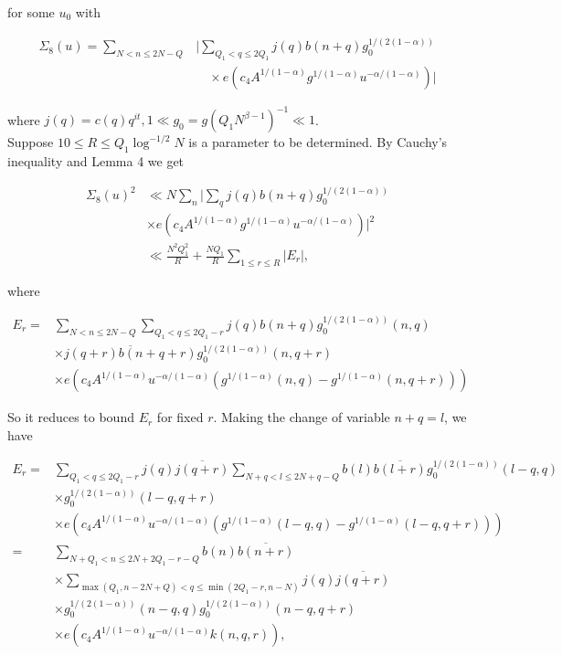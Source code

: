 \documentclass[10pt]{article}
\begin{document}
for some $u_{0}$ with


\begin{align*}
\Sigma_{8}(u)=\sum_{N<n \leq 2 N-Q} & \biggl|\sum_{Q_{1}<q \leq 2 Q_{1}} j(q) b(n+q) g_{0}^{1 /(2(1-\alpha))}  \tag{2.25}\\
& \quad \times e\left(c_{4} A^{1 /(1-\alpha)} g^{1 /(1-\alpha)} u^{-\alpha /(1-\alpha)}\right)\biggr|
\end{align*}


where $j(q)=c(q) q^{i t}, 1 \ll g_{0}=g\left(Q_{1} N^{\beta-1}\right)^{-1} \ll 1$.\\
Suppose $10 \leq R \leq Q_{1} \log ^{-1 / 2} N$ is a parameter to be determined. By Cauchy's inequality and Lemma 4 we get


\begin{align*}
\Sigma_{8}(u)^{2} & \ll N \sum_{n} \biggl|\sum_{q} j(q) b(n+q) g_{0}^{1 /(2(1-\alpha))}  \tag{2.26}\\
& \times e\left(c_{4} A^{1 /(1-\alpha)} g^{1 /(1-\alpha)} u^{-\alpha /(1-\alpha)}\right)\biggr|^{2} \\
& \ll \frac{N^{2} Q_{1}^{2}}{R}+\frac{N Q_{1}}{R} \sum_{1 \leq r \leq R}\left|E_{r}\right|,
\end{align*}


where

$$
\begin{aligned}
E_{r}= & \sum_{N<n \leq 2 N-Q} \sum_{Q_{1}<q \leq 2 Q_{1}-r} j(q) b(n+q) g_{0}^{1 /(2(1-\alpha))}(n, q) \\
& \times \overline{j(q+r) b(n+q+r)} g_{0}^{1 /(2(1-\alpha))}(n, q+r) \\
& \times e\left(c_{4} A^{1 /(1-\alpha)} u^{-\alpha /(1-\alpha)}\left(g^{1/(1-\alpha)}(n,q)-g^{1/(1-\alpha)}(n,q+r)\right)\right)
\end{aligned}
$$

So it reduces to bound $E_{r}$ for fixed $r$. Making the change of variable $n+q=l$, we have

$$
\begin{aligned}
E_{r}= & \sum_{Q_{1}<q \leq 2 Q_{1}-r} j(q) \overline{j(q+r)} \sum_{N+q<l \leq 2 N+q-Q} b(l) \overline{b(l+r)} g_{0}^{1 /(2(1-\alpha))}(l-q, q) \\
& \times g_{0}^{1 /(2(1-\alpha))}(l-q, q+r) \\
& \times e\left(c_{4} A^{1 /(1-\alpha)} u^{-\alpha /(1-\alpha)}\left(g^{1/(1-\alpha)}(l-q,q)-g^{1/(1-\alpha)}(l-q,q+r)\right)\right) \\
= & \sum_{N+Q_{1}<n \leq 2 N+2 Q_{1}-r-Q} b(n) \overline{b(n+r)} \\
& \times \sum_{\max \left(Q_{1}, n-2 N+Q\right)<q \leq \min \left(2 Q_{1}-r, n-N\right)} j(q) \overline{j(q+r)} \\
& \times g_{0}^{1 /(2(1-\alpha))}(n-q, q) g_{0}^{1 /(2(1-\alpha))}(n-q, q+r) \\
& \times e\left(c_{4} A^{1 /(1-\alpha)} u^{-\alpha /(1-\alpha)} k(n, q, r)\right),
\end{aligned}
$$
\end{document}
